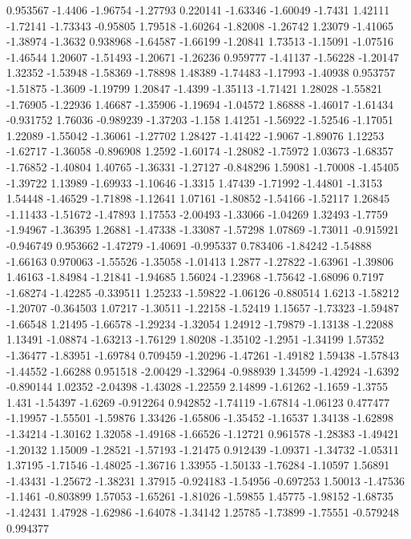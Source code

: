 \documentclass[9pt]{article}
\theoremstyle{plain}
\theoremstyle{definition}
\theoremstyle{remark}
\numberwithin{equation}{section}
\begin{document}
0.953567
-1.4406
-1.96754
-1.27793
0.220141
-1.63346
-1.60049
-1.7431
1.42111
-1.72141
-1.73343
-0.95805
1.79518
-1.60264
-1.82008
-1.26742
1.23079
-1.41065
-1.38974
-1.3632
0.938968
-1.64587
-1.66199
-1.20841
1.73513
-1.15091
-1.07516
-1.46544
1.20607
-1.51493
-1.20671
-1.26236
0.959777
-1.41137
-1.56228
-1.20147
1.32352
-1.53948
-1.58369
-1.78898
1.48389
-1.74483
-1.17993
-1.40938
0.953757
-1.51875
-1.3609
-1.19799
1.20847
-1.4399
-1.35113
-1.71421
1.28028
-1.55821
-1.76905
-1.22936
1.46687
-1.35906
-1.19694
-1.04572
1.86888
-1.46017
-1.61434
-0.931752
1.76036
-0.989239
-1.37203
-1.158
1.41251
-1.56922
-1.52546
-1.17051
1.22089
-1.55042
-1.36061
-1.27702
1.28427
-1.41422
-1.9067
-1.89076
1.12253
-1.62717
-1.36058
-0.896908
1.2592
-1.60174
-1.28082
-1.75972
1.03673
-1.68357
-1.76852
-1.40804
1.40765
-1.36331
-1.27127
-0.848296
1.59081
-1.70008
-1.45405
-1.39722
1.13989
-1.69933
-1.10646
-1.3315
1.47439
-1.71992
-1.44801
-1.3153
1.54448
-1.46529
-1.71898
-1.12641
1.07161
-1.80852
-1.54166
-1.52117
1.26845
-1.11433
-1.51672
-1.47893
1.17553
-2.00493
-1.33066
-1.04269
1.32493
-1.7759
-1.94967
-1.36395
1.26881
-1.47338
-1.33087
-1.57298
1.07869
-1.73011
-0.915921
-0.946749
0.953662
-1.47279
-1.40691
-0.995337
0.783406
-1.84242
-1.54888
-1.66163
0.970063
-1.55526
-1.35058
-1.01413
1.2877
-1.27822
-1.63961
-1.39806
1.46163
-1.84984
-1.21841
-1.94685
1.56024
-1.23968
-1.75642
-1.68096
0.7197
-1.68274
-1.42285
-0.339511
1.25233
-1.59822
-1.06126
-0.880514
1.6213
-1.58212
-1.20707
-0.364503
1.07217
-1.30511
-1.22158
-1.52419
1.15657
-1.73323
-1.59487
-1.66548
1.21495
-1.66578
-1.29234
-1.32054
1.24912
-1.79879
-1.13138
-1.22088
1.13491
-1.08874
-1.63213
-1.76129
1.80208
-1.35102
-1.2951
-1.34199
1.57352
-1.36477
-1.83951
-1.69784
0.709459
-1.20296
-1.47261
-1.49182
1.59438
-1.57843
-1.44552
-1.66288
0.951518
-2.00429
-1.32964
-0.988939
1.34599
-1.42924
-1.6392
-0.890144
1.02352
-2.04398
-1.43028
-1.22559
2.14899
-1.61262
-1.1659
-1.3755
1.431
-1.54397
-1.6269
-0.912264
0.942852
-1.74119
-1.67814
-1.06123
0.477477
-1.19957
-1.55501
-1.59876
1.33426
-1.65806
-1.35452
-1.16537
1.34138
-1.62898
-1.34214
-1.30162
1.32058
-1.49168
-1.66526
-1.12721
0.961578
-1.28383
-1.49421
-1.20132
1.15009
-1.28521
-1.57193
-1.21475
0.912439
-1.09371
-1.34732
-1.05311
1.37195
-1.71546
-1.48025
-1.36716
1.33955
-1.50133
-1.76284
-1.10597
1.56891
-1.43431
-1.25672
-1.38231
1.37915
-0.924183
-1.54956
-0.697253
1.50013
-1.47536
-1.1461
-0.803899
1.57053
-1.65261
-1.81026
-1.59855
1.45775
-1.98152
-1.68735
-1.42431
1.47928
-1.62986
-1.64078
-1.34142
1.25785
-1.73899
-1.75551
-0.579248
0.994377
\end{document}
